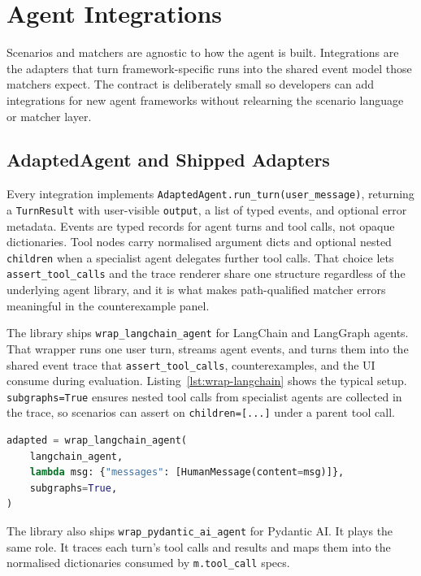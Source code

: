 \section{Agent Integrations}
\label{sec:integrations}

Scenarios and matchers are agnostic to how the agent is built. Integrations are the adapters that turn framework-specific runs into the shared event model those matchers expect. The contract is deliberately small so developers can add integrations for new agent frameworks without relearning the scenario language or matcher layer.

\subsection{AdaptedAgent and Shipped Adapters}

Every integration implements \texttt{AdaptedAgent.run\_turn(user\_message)}, returning a \texttt{TurnResult} with user-visible \texttt{output}, a list of typed events, and optional error metadata. Events are typed records for agent turns and tool calls, not opaque dictionaries. Tool nodes carry normalised argument dicts and optional nested \texttt{children} when a specialist agent delegates further tool calls. That choice lets \texttt{assert\_tool\_calls} and the trace renderer share one structure regardless of the underlying agent library, and it is what makes path-qualified matcher errors meaningful in the counterexample panel.

The library ships \texttt{wrap\_langchain\_agent} for LangChain and LangGraph agents. That wrapper runs one user turn, streams agent events, and turns them into the shared event trace that \texttt{assert\_tool\_calls}, counterexamples, and the UI consume during evaluation. Listing~\ref{lst:wrap-langchain} shows the typical setup. \texttt{subgraphs=True} ensures nested tool calls from specialist agents are collected in the trace, so scenarios can assert on \texttt{children=[...]} under a parent tool call.

\begin{lstlisting}[language=Python,caption={Wrapping a LangGraph agent for scenario execution.},label=lst:wrap-langchain]
adapted = wrap_langchain_agent(
    langchain_agent,
    lambda msg: {"messages": [HumanMessage(content=msg)]},
    subgraphs=True,
)
\end{lstlisting}

The library also ships \texttt{wrap\_pydantic\_ai\_agent} for Pydantic AI. It plays the same role. It traces each turn's tool calls and results and maps them into the normalised dictionaries consumed by \texttt{m.tool\_call} specs.

